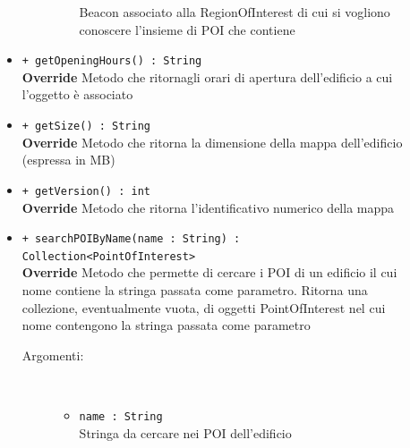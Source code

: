 \documentclass[../DefinizioneDiProdotto.tex]{subfiles}
\begin{document}
\begin{description}
\begin{itemize}
\begin{description}
\begin{itemize}
				Beacon associato alla RegionOfInterest di cui si vogliono conoscere l'insieme di POI che contiene\end{itemize}
		\end{description}
		\item \texttt{+ getOpeningHours() : String}\\
		\textbf{Override} Metodo che ritornagli orari di apertura dell'edificio a cui l'oggetto è associato
		\item \texttt{+ getSize() : String}\\
		\textbf{Override} Metodo che ritorna la dimensione della mappa dell'edificio (espressa in MB)
		\item \texttt{+ getVersion() : int}\\
		\textbf{Override} Metodo che ritorna l'identificativo numerico della mappa
		\item \texttt{+ searchPOIByName(name : String) : Collection<PointOfInterest>}\\
		\textbf{Override} Metodo che permette di cercare i POI di un edificio il cui nome contiene la stringa passata come parametro. Ritorna una collezione, eventualmente vuota,  di oggetti PointOfInterest nel cui nome contengono la stringa passata come parametro
		\begin{description}
			\item[Argomenti:] \
			\begin{itemize}
				\item \texttt{name : String}\\
				Stringa da cercare nei POI dell'edificio\end{itemize}
		\end{description}
	\end{itemize}
\end{description}
\end{document}
